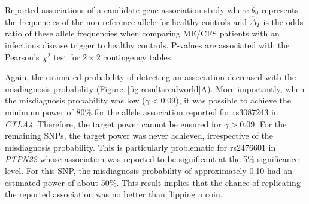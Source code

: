 \begin{table}[h!]
    \centering
    \caption[Reported associations of a candidate gene association study \citep{steiner2020AutoimmunityRelatedRisk}]{Reported associations of a candidate gene association study \citep{steiner2020AutoimmunityRelatedRisk} where $\hat \theta_0$ represents the frequencies of the non-reference allele for healthy controls and $\hat \Delta_T$ is the odds ratio of these allele frequencies when comparing ME/CFS patients with an infectious disease trigger to healthy controls. P-values are associated with the Pearson's $\chi^2$ test for $2 \times 2$ contingency tables.}
    
    \label{tab:candidate-gene-parameters}
\end{table}

Again, the estimated probability of detecting an association decreased with the misdiagnosis probability (Figure~\ref{fig:resultsrealworld}A). More importantly, when the misdiagnosis probability was low ($\gamma < 0.09$), it was possible to achieve the minimum power of 80\% for the allele association reported for rs3087243 in \textit{CTLA4}. Therefore, the target power cannot be ensured for $\gamma > 0.09$. For the remaining SNPs, the target power was never achieved, irrespective of the misdiagnosis probability. This is particularly problematic for rs2476601 in \textit{PTPN22} whose association was reported to be significant at the 5\% significance level. For this SNP, the misdiagnosis probability of approximately 0.10 had an estimated power of about 50\%. This result implies that the chance of replicating the reported association was no better than flipping a coin.

